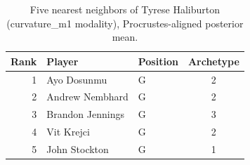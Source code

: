 \begin{table}[htbp]
  \centering\small
  \begin{tabular}{rllc}
    \toprule
    Rank & Player & Position & Archetype \\
    \midrule
    1 & Ayo Dosunmu & G & 2 \\
    2 & Andrew Nembhard & G & 2 \\
    3 & Brandon Jennings & G & 3 \\
    4 & Vit Krejci & G & 2 \\
    5 & John Stockton & G & 1 \\
    \bottomrule
  \end{tabular}
  \caption{Five nearest neighbors of Tyrese Haliburton (curvature_m1 modality), Procrustes-aligned posterior mean.}
  \label{tab:Tyrese_Haliburton_neighbors_curvature_m1}
\end{table}

